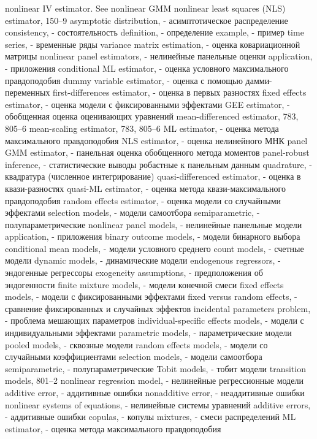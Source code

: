 nonlinear IV estimator. See nonlinear GMM nonlinear least squares (NLS) estimator, 150–9
asymptotic distribution, - асимптотическое распределение 
consistency, - состоятельность
definition, - определение
example, - пример
time series, - временные ряды
variance matrix estimation, - оценка ковариационной матрицы
nonlinear panel estimators, - нелинейные панельные оценки
application, - приложения
conditional ML estimator, - оценка условного максимального правдоподобия
dummy variable estimator, - оценка с помощью дамми-переменных 
first-differences estimator, - оценка в первых разностях
fixed effects estimator, - оценка модели с фиксированными эффектами
GEE estimator, - обобщенная оценка оценивающих уравнений
mean-differenced estimator, 783, 805–6 
mean-scaling estimator, 783, 805–6
ML estimator, - оценка метода максимального правдоподобия
NLS estimator, - оценка нелинейного МНК
panel GMM estimator, - панельная оценка обобщенного метода моментов
panel-robust inference, - статистические выводы робастные к панельным данным
quadrature, - квадратура (численное интегрирование)
quasi-differenced estimator, - оценка в квази-разностях
quasi-ML estimator, - оценка метода квази-максимального правдоподобия
random effects estimator, - оценка модели со случайными эффектами
selection models, - модели самоотбора
semiparametric, - полупараметрические
nonlinear panel models, - нелинейные панельные модели
application, - приложения
binary outcome models, - модели бинарного выбора
conditional mean models, - модели условного среднего
count models, - счетные модели
dynamic models, - динамические модели 
endogenous regressors, - эндогенные регрессоры 
exogeneity assumptions, - предположения об эндогенности
finite mixture models, - модели конечной смеси
fixed effects models, - модели с фиксированными эффектами
fixed versus random effects, - сравнение фиксированных и случайных эффектов 
incidental parameters problem, - проблема мешающих параметров
individual-specific effects models, - модели с индивидуальными эффектами 
parametric models, - параметрические модели
pooled models, - сквозные модели
random effects models, - модели со случайными коэффициентами
selection models, - модели самоотбора
semiparametric, - полупараметрические
Tobit models, - тобит модели
transition models, 801–2
nonlinear regression model, - нелинейные регрессионные модели
additive error, - аддитивные ошибки
nonadditive error, - неаддитивные ошибки
nonlinear systems of equations, - нелинейные системы уравнений
additive errors, - аддитивные ошибки
copulas, - копулы
mixtures, - смеси распределений
ML estimator, - оценка метода максимального правдоподобия
